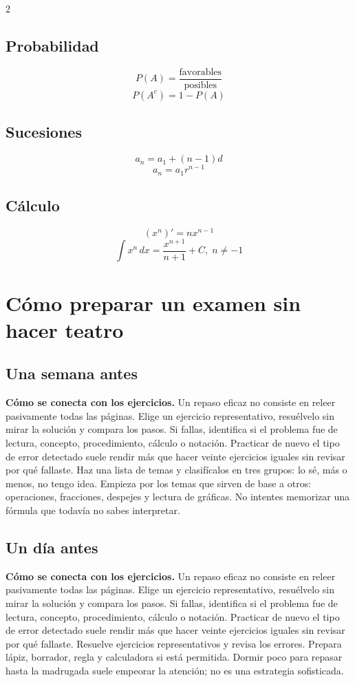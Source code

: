 \documentclass[10pt,oneside,openany]{book}
\begin{document}
\begin{multicols}{2}
\section*{Probabilidad}
\[
P(A)=\frac{\text{favorables}}{\text{posibles}}
\]
\[
P(A^c)=1-P(A)
\]
\section*{Sucesiones}
\[
a_n=a_1+(n-1)d
\]
\[
a_n=a_1r^{n-1}
\]
\section*{Cálculo}
\[
(x^n)'=nx^{n-1}
\]
\[
\int x^n\,dx=\frac{x^{n+1}}{n+1}+C,\;n\neq-1
\]
\end{multicols}
\normalsize

\chapter{Cómo preparar un examen sin hacer teatro}
\section{Una semana antes}

\textbf{Cómo se conecta con los ejercicios.} Un repaso eficaz no consiste en releer pasivamente todas las páginas. Elige un ejercicio representativo, resuélvelo sin mirar la solución y compara los pasos. Si fallas, identifica si el problema fue de lectura, concepto, procedimiento, cálculo o notación. Practicar de nuevo el tipo de error detectado suele rendir más que hacer veinte ejercicios iguales sin revisar por qué fallaste.
Haz una lista de temas y clasifícalos en tres grupos: lo sé, más o menos, no tengo idea. Empieza por los temas que sirven de base a otros: operaciones, fracciones, despejes y lectura de gráficas. No intentes memorizar una fórmula que todavía no sabes interpretar.

\section{Un día antes}

\textbf{Cómo se conecta con los ejercicios.} Un repaso eficaz no consiste en releer pasivamente todas las páginas. Elige un ejercicio representativo, resuélvelo sin mirar la solución y compara los pasos. Si fallas, identifica si el problema fue de lectura, concepto, procedimiento, cálculo o notación. Practicar de nuevo el tipo de error detectado suele rendir más que hacer veinte ejercicios iguales sin revisar por qué fallaste.
Resuelve ejercicios representativos y revisa los errores. Prepara lápiz, borrador, regla y calculadora si está permitida. Dormir poco para repasar hasta la madrugada suele empeorar la atención; no es una estrategia sofisticada.
\end{document}
